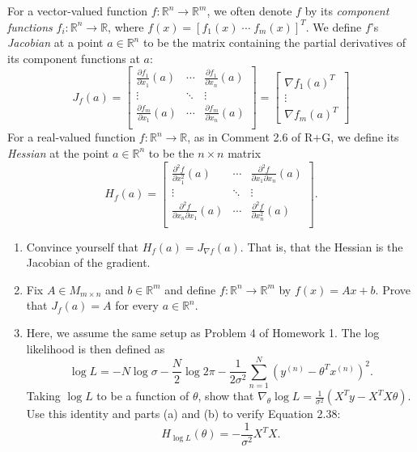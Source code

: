 \documentclass{article}
\newcommand{\R}{\mathbb{R}}
\newenvironment{envsection}[1]{\begin{trivlist}
\item[\hskip \labelsep {\bfseries #1}]}{\end{trivlist}}
\begin{document}
\begin{envsection}{Problem 3 (Hessian Matrix).}
    For a vector-valued function $f: \R^n \to \R^m$, we often denote $f$ by its \textit{component functions} $f_i: \R^n \to \R$, where $f(x) = [f_1(x)\; \cdots\; f_m(x)]^T$. We define $f$'s \textit{Jacobian} at a point $a \in \R^n$ to be the matrix containing the partial derivatives of its component functions at $a$:
    \[
    J_f(a) = 
    \begin{bmatrix}
        \frac{\partial f_1}{\partial x_1}(a) & \cdots & \frac{\partial f_1}{\partial x_n}(a)\\
        \vdots & \ddots & \vdots\\
        \frac{\partial f_m}{\partial x_1}(a) & \cdots & \frac{\partial f_m}{\partial x_n}(a)\\
    \end{bmatrix} 
    =
    \begin{bmatrix}
        \nabla f_1(a)^T\\
        \vdots\\
        \nabla f_m(a)^T
    \end{bmatrix}
    \]
    For a real-valued function $f: \R^n \to \R$, as in Comment 2.6 of R+G, we define its \textit{Hessian} at the point $a \in \R^n$ to be the $n \times n$ matrix
    \[
    H_f(a) = 
    \begin{bmatrix}
        \frac{\partial^2 f}{\partial x_1^2}(a) & \cdots & \frac{\partial^2 f}{\partial x_1\partial x_n}(a)\\
        \vdots & \ddots & \vdots\\
        \frac{\partial^2 f}{\partial x_n \partial x_1}(a) & \cdots & \frac{\partial^2 f}{\partial x_n^2}(a)\\
    \end{bmatrix}.
    \]
    \begin{enumerate}
        \item[(a)] Convince yourself that $H_f(a) = J_{\nabla f}(a)$. That is, that the Hessian is the Jacobian of the gradient.
        \item[(b)] Fix $A \in M_{m \times n}$ and $b \in \R^m$ and define $f: \R^n \to \R^m$ by $f(x) = Ax + b$. Prove that $J_f(a) = A$ for every $a \in \R^n$.
        \item[(c)] Here, we assume the same setup as Problem 4 of Homework 1. The log likelihood is then defined as
            \[
            \log L = -N \log \sigma - \frac{N}{2} \log 2\pi - \frac{1}{2\sigma^2} \sum_{n=1}^{N}(y^{(n)} - \theta^Tx^{(n)})^2.
            \]
            Taking $\log L$ to be a function of $\theta$, show that $\nabla_\theta \log L = \frac{1}{\sigma^2}(X^Ty - X^TX\theta)$. Use this identity and parts (a) and (b) to verify Equation 2.38:
            \[
            H_{\log L}(\theta) = - \frac{1}{\sigma^2} X^TX.
            \]
    \end{enumerate}
\end{envsection}
\end{document}
